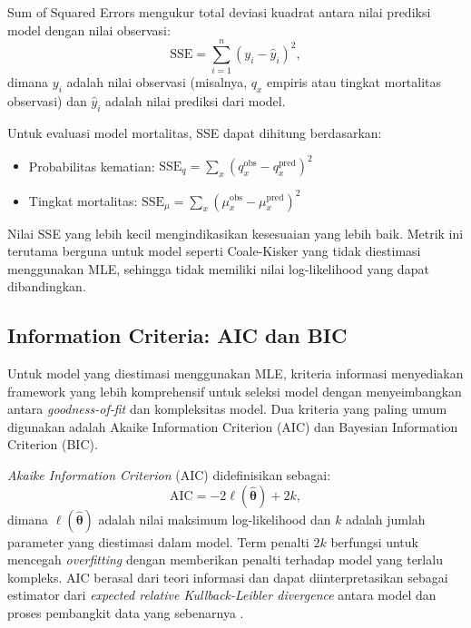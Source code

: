 Sum of Squared Errors mengukur total deviasi kuadrat antara nilai prediksi model dengan nilai observasi:
\begin{equation}
\text{SSE} = \sum_{i=1}^{n} (y_i - \hat{y}_i)^2,
\label{eq:sse}
\end{equation}
dimana $y_i$ adalah nilai observasi (misalnya, $q_x$ empiris atau tingkat mortalitas observasi) dan $\hat{y}_i$ adalah nilai prediksi dari model.

Untuk evaluasi model mortalitas, SSE dapat dihitung berdasarkan:
\begin{itemize}
    \item Probabilitas kematian: $\text{SSE}_q = \sum_x (q_x^{\text{obs}} - q_x^{\text{pred}})^2$
    \item Tingkat mortalitas: $\text{SSE}_\mu = \sum_x (\mu_x^{\text{obs}} - \mu_x^{\text{pred}})^2$
\end{itemize}

Nilai SSE yang lebih kecil mengindikasikan kesesuaian yang lebih baik. Metrik ini terutama berguna untuk model seperti Coale-Kisker yang tidak diestimasi menggunakan MLE, sehingga tidak memiliki nilai log-likelihood yang dapat dibandingkan.

\subsection{Information Criteria: AIC dan BIC}

Untuk model yang diestimasi menggunakan MLE, kriteria informasi menyediakan framework yang lebih komprehensif untuk seleksi model dengan menyeimbangkan antara \textit{goodness-of-fit} dan kompleksitas model. Dua kriteria yang paling umum digunakan adalah Akaike Information Criterion (AIC) dan Bayesian Information Criterion (BIC).

\textit{Akaike Information Criterion} (AIC) didefinisikan sebagai:
\begin{equation}
\text{AIC} = -2\ell(\hat{\boldsymbol{\theta}}) + 2k,
\label{eq:aic}
\end{equation}
dimana $\ell(\hat{\boldsymbol{\theta}})$ adalah nilai maksimum log-likelihood dan $k$ adalah jumlah parameter yang diestimasi dalam model. Term penalti $2k$ berfungsi untuk mencegah \textit{overfitting} dengan memberikan penalti terhadap model yang terlalu kompleks. AIC berasal dari teori informasi dan dapat diinterpretasikan sebagai estimator dari \textit{expected relative Kullback-Leibler divergence} antara model dan proses pembangkit data yang sebenarnya \citep{akaike1974new}.

